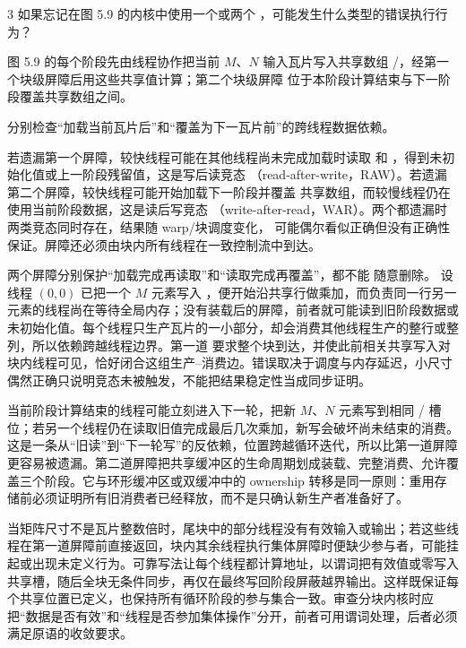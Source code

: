 \begin{solutionexercise}{3}
\problemheading 如果忘记在图 5.9 的内核中使用一个或两个
，可能发生什么类型的错误执行行为？

图 5.9 的每个阶段先由线程协作把当前 $M$、$N$ 输入瓦片写入共享数组
/，经第一个块级屏障后用这些共享值计算；第二个块级屏障
位于本阶段计算结束与下一阶段覆盖共享数组之间。

\approachheading 分别检查“加载当前瓦片后”和“覆盖为下一瓦片前”的跨线程数据依赖。

\answerheading 若遗漏第一个屏障，较快线程可能在其他线程尚未完成加载时读取
 和 ，得到未初始化值或上一阶段残留值，这是写后读竞态
（read-after-write，RAW）。若遗漏第二个屏障，较快线程可能开始加载下一阶段并覆盖
共享数组，而较慢线程仍在使用当前阶段数据，这是读后写竞态
（write-after-read，WAR）。两个都遗漏时两类竞态同时存在，结果随 warp/块调度变化，
可能偶尔看似正确但没有正确性保证。屏障还必须由块内所有线程在一致控制流中到达。

\conclusionheading 两个屏障分别保护“加载完成再读取”和“读取完成再覆盖”，都不能
随意删除。
\discussionheading
{}
设线程 $(0,0)$ 已把一个 $M$ 元素写入 ，便开始沿共享行做乘加，而负责同一行另一元素的线程尚在等待全局内存；没有装载后的屏障，前者就可能读到旧阶段数据或未初始化值。每个线程只生产瓦片的一小部分，却会消费其他线程生产的整行或整列，所以依赖跨越线程边界。第一道  要求整个块到达，并使此前相关共享写入对块内线程可见，恰好闭合这组生产--消费边。错误取决于调度与内存延迟，小尺寸偶然正确只说明竞态未被触发，不能把结果稳定性当成同步证明。

当前阶段计算结束的线程可能立刻进入下一轮，把新 $M$、$N$ 元素写到相同 / 槽位；若另一个线程仍在读取旧值完成最后几次乘加，新写会破坏尚未结束的消费。这是一条从“旧读”到“下一轮写”的反依赖，位置跨越循环迭代，所以比第一道屏障更容易被遗漏。第二道屏障把共享缓冲区的生命周期划成装载、完整消费、允许覆盖三个阶段。它与环形缓冲区或双缓冲中的 ownership 转移是同一原则：重用存储前必须证明所有旧消费者已经释放，而不是只确认新生产者准备好了。

当矩阵尺寸不是瓦片整数倍时，尾块中的部分线程没有有效输入或输出；若这些线程在第一道屏障前直接返回，块内其余线程执行集体屏障时便缺少参与者，可能挂起或出现未定义行为。可靠写法让每个线程都计算地址，以谓词把有效值或零写入共享槽，随后全块无条件同步，再仅在最终写回阶段屏蔽越界输出。这样既保证每个共享位置已定义，也保持所有循环阶段的参与集合一致。审查分块内核时应把“数据是否有效”和“线程是否参加集体操作”分开，前者可用谓词处理，后者必须满足原语的收敛要求。


\end{solutionexercise}

